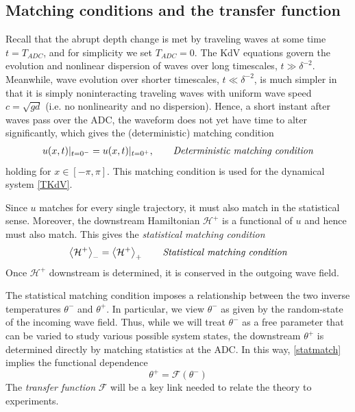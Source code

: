 \documentclass[11pt]{article}
\newcommand{\mean}[1]{\left< #1 \right>}
\newcommand{\depth}{d}
\newcommand{\Ham}{\mathcal{H}}
\newcommand{\Hdn}{\Ham^{+}}
\newcommand{\thup}{\theta^{-}}
\newcommand{\thdn}{\theta^{+}}
\newcommand{\meanup}[1]{\mean{#1}_{-}}
\newcommand{\meandn}[1]{\mean{#1}_{+}}
\newcommand{\transf}{\mathcal{F}}
\begin{document}
\subsection{Matching conditions and the transfer function}

	Recall that the abrupt depth change is met by traveling waves at some time $t = T_{ADC}$, and for simplicity we set $T_{ADC} = 0$. The KdV equations govern the evolution and nonlinear dispersion of waves over long timescales, $t \gg \delta^{-2}$. Meanwhile, wave evolution over shorter timescales, $t \ll \delta^{-2}$, is much simpler in that it is simply noninteracting traveling waves with uniform wave speed $c = \sqrt{g \depth}$ (i.e. no nonlinearity and no dispersion). Hence, a short instant after waves pass over the ADC, the waveform does not yet have time to alter significantly, which gives the (deterministic) matching condition
\begin{align}
u(x,t) \vert_{t=0^-} = u(x,t) \vert_{t=0^+},
\qquad \mbox{\em Deterministic matching condition}
\end{align}
holding for $x \in [-\pi, \pi]$. This matching condition is used for the dynamical system \eqref{TKdV}.

	Since $u$ matches for every single trajectory, it must also match in the statistical sense. Moreover, the downstream Hamiltonian $\Hdn$ is a functional of $u$ and hence must also match. This gives the {\em statistical matching condition}
\begin{align}
\label{statmatch}
\meanup{\Hdn} = \meandn{\Hdn}
\qquad \mbox{\em Statistical matching condition}
\end{align}
Once $\Hdn$ downstream is determined, it is conserved in the outgoing wave field.

	The statistical matching condition imposes a relationship between the two inverse temperatures $\thup$ and $\thdn$. In particular, we view $\thup$ as given by the random-state of the incoming wave field. Thus, while we will treat $\thup$ as a free parameter that can be varied to study various possible system states, the downstream $\thdn$ is determined directly by matching statistics at the ADC. In this way, \eqref{statmatch} implies the functional dependence
\begin{equation}
\thdn = \transf \left( \thup \right)
\end{equation}
The {\em transfer function} $\transf$ will be a key link needed to relate the theory to experiments.
\end{document}

